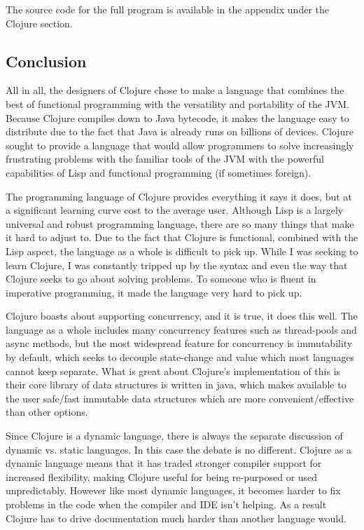     The source code for the full program is available in the appendix under the Clojure section.

\subsection{Conclusion}

    All in all, the designers of Clojure chose to make a language that combines the best of functional programming with the versatility and portability of the JVM. Because Clojure compiles down to Java bytecode, it makes the language easy to distribute due to the fact that Java is already runs on billions of devices. Clojure sought to provide a language that would allow programmers to solve increasingly frustrating problems with the familiar tools of the JVM with the powerful capabilities of Lisp and functional programming (if sometimes foreign).
    
    The programming language of Clojure provides everything it says it does, but at a significant learning curve cost to the average user. Although Lisp is a largely universal and robust programming language, there are so many things that make it hard to adjust to. Due to the fact that Clojure is functional, combined with the Lisp aspect, the language as a whole is difficult to pick up. While I was seeking to learn Clojure, I was constantly tripped up by the syntax and even the way that Clojure seeks to go about solving problems. To someone who is fluent in imperative programming, it made the language very hard to pick up.
    
    Clojure boasts about supporting concurrency, and it is true, it does this well. The language as a whole includes many concurrency features such as thread-pools and async methods, but the most widespread feature for concurrency is immutability by default, which seeks to decouple state-change and value which most languages cannot keep separate. What is great about Clojure's implementation of this is their core library of data structures is written in java, which makes available to the user safe/fast immutable data structures which are more convenient/effective than other options. 
    
    Since Clojure is a dynamic language, there is always the separate discussion of dynamic vs. static languages. In this case the debate is no different. Clojure as a dynamic language means that it has traded stronger compiler support for increased flexibility, making Clojure useful for being re-purposed or used unpredictably. However like most dynamic languages, it becomes harder to fix problems in the code when the compiler and IDE isn't helping. As a result Clojure has to drive documentation much harder than another language would. 
    
